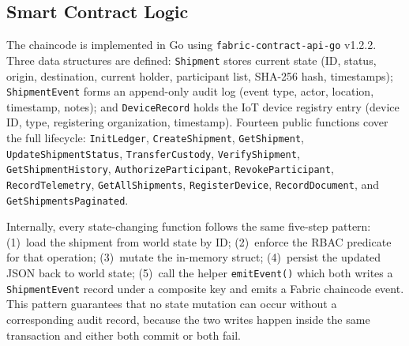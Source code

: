 \documentclass[conference]{IEEEtran}
\begin{document}
\subsection{Smart Contract Logic}

The chaincode is implemented in Go using
\texttt{fabric-contract-api-go} v1.2.2.  Three data structures are defined:
\texttt{Shipment} stores current state (ID, status, origin, destination,
current holder, participant list, SHA-256 hash, timestamps);
\texttt{ShipmentEvent} forms an append-only audit log (event type, actor,
location, timestamp, notes); and \texttt{DeviceRecord} holds the IoT device
registry entry (device ID, type, registering organization, timestamp).
Fourteen public functions cover the full lifecycle:
\texttt{InitLedger}, \texttt{CreateShipment},
\texttt{GetShipment}, \texttt{UpdateShipmentStatus},
\texttt{TransferCustody}, \texttt{VerifyShipment},
\texttt{GetShipmentHistory}, \texttt{AuthorizeParticipant},
\texttt{RevokeParticipant}, \texttt{RecordTelemetry},
\texttt{GetAllShipments}, \texttt{RegisterDevice},
\texttt{RecordDocument}, and \texttt{GetShipmentsPaginated}.

Internally, every state-changing function follows the same five-step
pattern: (1)~load the shipment from world state by ID; (2)~enforce the
RBAC predicate for that operation; (3)~mutate the in-memory struct;
(4)~persist the updated JSON back to world state; (5)~call the helper
\texttt{emitEvent()} which both writes a \texttt{ShipmentEvent} record
under a composite key and emits a Fabric chaincode event.  This pattern
guarantees that no state mutation can occur without a corresponding audit
record, because the two writes happen inside the same transaction and
either both commit or both fail.
\end{document}
